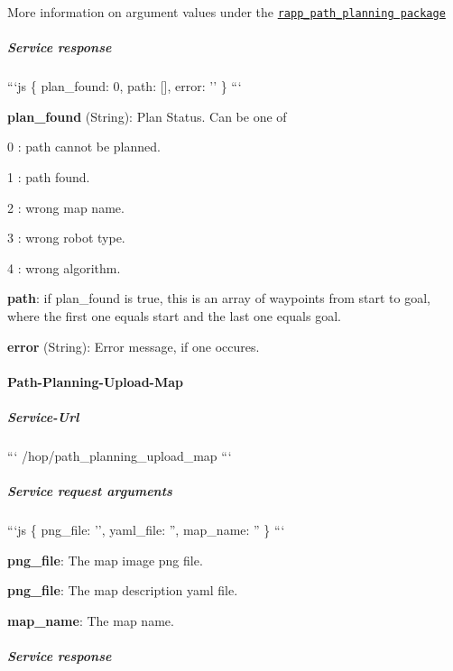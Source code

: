 More information on argument values under the \href{https://github.com/rapp-project/rapp-platform/tree/master/rapp_path_planning/rapp_path_planning}{\tt rapp\-\_\-path\-\_\-planning package}

\subparagraph*{Service response}

```js \{ plan\-\_\-found\-: 0, path\-: \mbox{[}\mbox{]}, error\-: '' \} ```


\begin{DoxyItemize}
\item {\bfseries plan\-\_\-found} (String)\-: Plan Status. Can be one of
\begin{DoxyItemize}
\item 0 \-: path cannot be planned.
\item 1 \-: path found.
\item 2 \-: wrong map name.
\item 3 \-: wrong robot type.
\item 4 \-: wrong algorithm.
\end{DoxyItemize}
\item {\bfseries path}\-: if plan\-\_\-found is true, this is an array of waypoints from start to goal, where the first one equals start and the last one equals goal.
\item {\bfseries error} (String)\-: Error message, if one occures.
\end{DoxyItemize}

\paragraph*{Path-\/\-Planning-\/\-Upload-\/\-Map}

\subparagraph*{Service-\/\-Url}

``` /hop/path\-\_\-planning\-\_\-upload\-\_\-map ```

\subparagraph*{Service request arguments}

```js \{ png\-\_\-file\-: '', yaml\-\_\-file\-: '', map\-\_\-name\-: '' \} ```


\begin{DoxyItemize}
\item {\bfseries png\-\_\-file}\-: The map image png file.
\item {\bfseries png\-\_\-file}\-: The map description yaml file.
\item {\bfseries map\-\_\-name}\-: The map name.
\end{DoxyItemize}

\subparagraph*{Service response}

